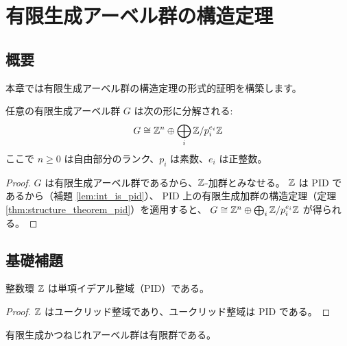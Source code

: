 \chapter{有限生成アーベル群の構造定理}
\label{chap:abelian_group}

\section{概要}

本章では有限生成アーベル群の構造定理の形式的証明を構築します。

\begin{theorem}[有限生成アーベル群の構造定理]
\label{thm:structure_theorem_fg_abelian}
任意の有限生成アーベル群 $G$ は次の形に分解される:
\[
  G \cong \mathbb{Z}^n \oplus \bigoplus_{i} \mathbb{Z} / p_i^{e_i}\mathbb{Z}
\]
ここで $n \geq 0$ は自由部分のランク、$p_i$ は素数、$e_i$ は正整数。
\end{theorem}

\begin{proof}
$G$ は有限生成アーベル群であるから、$\Z$-加群とみなせる。
$\Z$ は PID であるから（補題 \ref{lem:int_is_pid}）、
PID 上の有限生成加群の構造定理（定理 \ref{thm:structure_theorem_pid}）を適用すると、
$G \cong \mathbb{Z}^n \oplus \bigoplus_i \mathbb{Z} / p_i^{e_i}\mathbb{Z}$ が得られる。
\end{proof}

\section{基礎補題}

\begin{lemma}[$\Z$ は PID]
\label{lem:int_is_pid}
\uses{}
整数環 $\Z$ は単項イデアル整域（PID）である。
\end{lemma}

\begin{proof}
$\Z$ はユークリッド整域であり、ユークリッド整域は PID である。
\end{proof}

\begin{lemma}[有限生成ねじれアーベル群の有限性]
\label{lem:fg_torsion_is_finite}
\uses{}
有限生成かつねじれアーベル群は有限群である。
\end{lemma}

